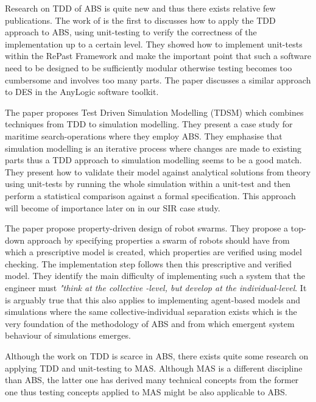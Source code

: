 Research on TDD of ABS is quite new and thus there exists relative few publications. The work of \cite{collier_test-driven_2013} is the first to discusses how to apply the TDD approach to ABS, using unit-testing to verify the correctness of the implementation up to a certain level. They showed how to implement unit-tests within the RePast Framework and make the important point that such a software need to be designed to be sufficiently modular otherwise testing becomes too cumbersome and involves too many parts. The paper \cite{asta_investigation_2014} discusses a similar approach to DES in the AnyLogic software toolkit. 

The paper \cite{onggo_test-driven_2016} proposes Test Driven Simulation Modelling (TDSM) which combines techniques from TDD to simulation modelling. They present a case study for maritime search-operations where they employ ABS. They emphasise that simulation modelling is an iterative process where changes are made to existing parts thus a TDD approach to simulation modelling seems to be a good match. They present how to validate their model against analytical solutions from theory using unit-tests by running the whole simulation within a unit-test and then perform a statistical comparison against a formal specification. This approach will become of importance later on in our SIR case study.

The paper \cite{brambilla_property-driven_2012} propose property-driven design of robot swarms. They propose a top-down approach by specifying properties a swarm of robots should have from which a prescriptive model is created, which properties are verified using model checking. The implementation step follows then this prescriptive and verified model. They identify the main difficulty of implementing such a system that the engineer must \textit{"think at the collective -level, but develop at the individual-level}. It is arguably true that this also applies to implementing agent-based models and simulations where the same collective-individual separation exists which is the very foundation of the methodology of ABS and from which emergent system behaviour of simulations emerges.

Although the work on TDD is scarce in ABS, there exists quite some research on applying TDD and unit-testing to MAS. Although MAS is a different discipline than ABS, the latter one has derived many technical concepts from the former one thus testing concepts applied to MAS might be also applicable to ABS. 

